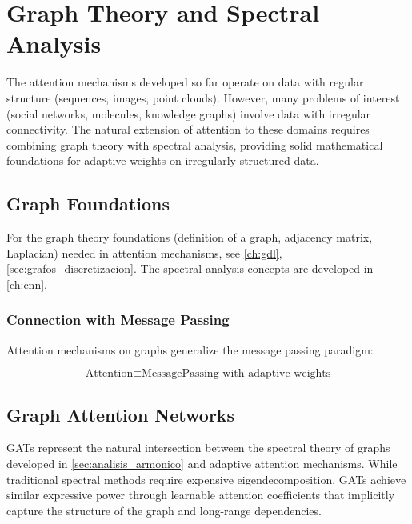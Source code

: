\section{Graph Theory and Spectral Analysis}

The attention mechanisms developed so far operate on data with regular structure (sequences, images, point clouds). However, many problems of interest (social networks, molecules, knowledge graphs) involve data with irregular connectivity. The natural extension of attention to these domains requires combining graph theory with spectral analysis, providing solid mathematical foundations for adaptive weights on irregularly structured data.

\subsection{Graph Foundations}

For the graph theory foundations (definition of a graph, adjacency matrix, Laplacian) needed in attention mechanisms, see \autoref{ch:gdl}, \autoref{sec:grafos_discretizacion}. The spectral analysis concepts are developed in \autoref{ch:cnn}.

\subsubsection{Connection with Message Passing}

Attention mechanisms on graphs generalize the message passing paradigm:

\begin{equation}
    \text{Attention} \equiv \text{MessagePassing with adaptive weights}
    \label{eq:attention_message_passing_equivalence}
\end{equation}

\subsection{Graph Attention Networks}\label{subsec:graph_attention_networks}\label{sec:graph_attention}

\glspl{GAT} represent the natural intersection between the spectral theory of graphs developed in \autoref{sec:analisis_armonico} and adaptive attention mechanisms. While traditional spectral methods require expensive eigendecomposition, \glspl{GAT} achieve similar expressive power through learnable attention coefficients that implicitly capture the structure of the graph and long-range dependencies.


